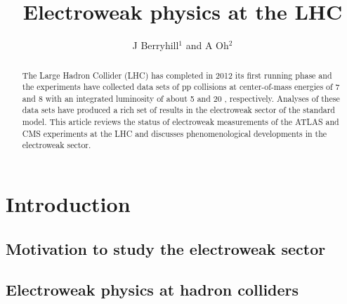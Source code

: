 \documentclass[12pt]{iopart}
\begin{document}
\title[Electroweak phyiscs at the LHC]{Electroweak physics at the LHC}
\author{J Berryhill$^1$ and A Oh$^2$}

\address{$^1$ Fermi National Accelerator Laboratory, Batavia, IL, USA}
\address{$^2$ School of Physics and Astronomy, University of Manchester, Manchester, UK}


\begin{abstract}
The Large Hadron Collider (LHC) has completed in 2012 its first
running phase and the experiments have collected data sets of pp
collisions at center-of-mass energies of 7 and 8 \TeV\xspace with an
integrated luminosity of about 5 \ifb and 20 \ifb, respectively.  Analyses
of these data sets have produced a rich set of results in the
electroweak sector of the standard model. This article reviews the
status of electroweak measurements of the ATLAS and CMS experiments at
the LHC and discusses phenomenological developments in the electroweak
sector.
\end{abstract}

%
%
\submitto{\jpg}
%
\maketitle
%
%


\section{Introduction}
\subsection{Motivation to study the electroweak sector}
\subsection{Electroweak physics at hadron colliders}
\end{document}
